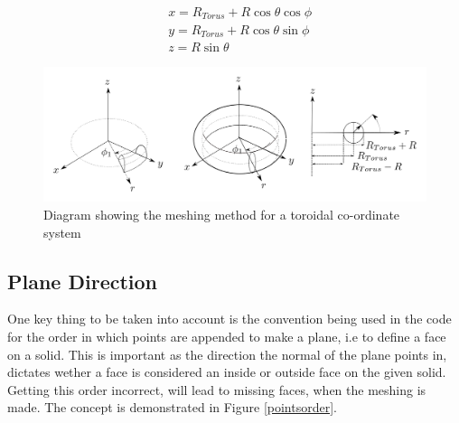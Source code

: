 \documentclass[12pt,a4paper]{article}
\begin{document}
\begin{equation}
\begin{aligned}
& x = R_{Torus} + R\cos{\theta}\cos{\phi} \\
& y = R_{Torus} + R\cos{\theta}\sin{\phi} \\
& z =  R\sin{\theta} 
\end{aligned}
\end{equation}

\begin{figure}[h!]
\centering
\includegraphics[scale=0.35]{Images//Coords/torus_coords.png}
\caption[width=\columnwidth]{Diagram showing the meshing method for a toroidal co-ordinate system}
\label{tormeshin}
\end{figure}

\subsection{Plane Direction}
\label{order}
One key thing to be taken into account is the convention being used in the code for the order in which points are appended to make a plane, i.e to define a face on a solid. This is important as the direction the normal of the plane points in, dictates wether a face is considered an inside or outside face on the given solid. Getting this order incorrect, will lead to missing faces, when the meshing is made. The concept is demonstrated in Figure \ref{pointsorder}.
\end{document}
